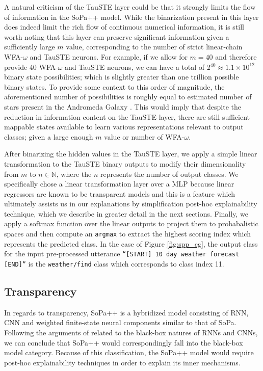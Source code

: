 A natural criticism of the TauSTE layer could be that it strongly limits the
flow of information in the SoPa++ model. While the binarization present in this
layer does indeed limit the rich flow of continuous numerical information, it is
still worth noting that this layer can preserve significant information given a
sufficiently large $m$ value, corresponding to the number of strict linear-chain
WFA-$\omega$ and TauSTE neurons. For example, if we allow for $m=40$ and therefore provide 40
WFA-$\omega$ and TauSTE neurons, we can have a total of
2$^{40}\approx1.1\times10^{12}$ binary state possibilities; which is slightly
greater than one trillion possible binary states. To provide some context to this
order of magnitude, the aforementioned number of possibilities is roughly equal
to estimated number of stars present in the Andromeda Galaxy
\citep{10.1093/mnras/stu879}. This would imply that despite the reduction in
information content on the TauSTE layer, there are still sufficient mappable
states available to learn various representations relevant to output classes;
given a large enough $m$ value or number of WFA-$\omega$.

After binarizing the hidden values in the TauSTE layer, we apply a simple linear
transformation to the TauSTE binary outputs to modify their dimensionality from
$m$ to $n \in \mathbb{N}$, where the $n$ represents the number of output
classes. We specifically chose a linear transformation layer over a MLP because
linear regressors are known to be transparent models
\citep{arrieta2020explainable} and this is a feature which ultimately assists us
in our explanations by simplification post-hoc explainability technique, which
we describe in greater detail in the next sections. Finally, we apply a softmax
function over the linear outputs to project them to probabalistic spaces and
then compute an \texttt{argmax} to extract the highest scoring index which represents the
predicted class. In the case of Figure \ref{fig:spp_cg}, the output class for
the input pre-processed utterance \texttt{``[START] 10 day weather forecast
  [END]''} is the \texttt{weather/find} class which corresponds to class index 11.

\subsection{Transparency}

\label{section:spp_transparency}

In regards to transparency, SoPa++ is a hybridized model consisting of RNN, CNN
and weighted finite-state neural components similar to that of SoPa. Following the
arguments of \citet{arrieta2020explainable} related to the black-box natures of
RNNs and CNNs, we can conclude that SoPa++ would correspondingly fall into the
black-box model category. Because of this classification, the SoPa++ model
would require post-hoc explainability techniques in order to explain its inner
mechanisms.

